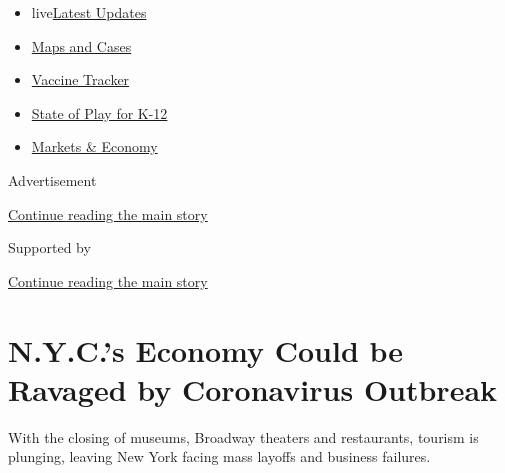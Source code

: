 \begin{itemize}
\tightlist
\item
  live\href{https://www.nytimes3xbfgragh.onion/2020/08/17/world/coronavirus-covid.html?name=styln-coronavirus-national\&region=TOP_BANNER\&variant=undefined\&block=storyline_menu_recirc\&action=click\&pgtype=Article\&impression_id=5fba8b31-e0fd-11ea-90ad-4f7da0581532}{Latest
  Updates}
\item
  \href{https://www.nytimes3xbfgragh.onion/interactive/2020/us/coronavirus-us-cases.html?name=styln-coronavirus-national\&region=TOP_BANNER\&variant=undefined\&block=storyline_menu_recirc\&action=click\&pgtype=Article\&impression_id=5fbab240-e0fd-11ea-90ad-4f7da0581532}{Maps
  and Cases}
\item
  \href{https://www.nytimes3xbfgragh.onion/interactive/2020/science/coronavirus-vaccine-tracker.html?name=styln-coronavirus-national\&region=TOP_BANNER\&variant=undefined\&block=storyline_menu_recirc\&action=click\&pgtype=Article\&impression_id=5fbab241-e0fd-11ea-90ad-4f7da0581532}{Vaccine
  Tracker}
\item
  \href{https://www.nytimes3xbfgragh.onion/2020/08/17/us/k-12-schools-reopening.html?name=styln-coronavirus-national\&region=TOP_BANNER\&variant=undefined\&block=storyline_menu_recirc\&action=click\&pgtype=Article\&impression_id=5fbab242-e0fd-11ea-90ad-4f7da0581532}{State
  of Play for K-12}
\item
  \href{https://www.nytimes3xbfgragh.onion/live/2020/08/17/business/stock-market-today-coronavirus?name=styln-coronavirus-national\&region=TOP_BANNER\&variant=undefined\&block=storyline_menu_recirc\&action=click\&pgtype=Article\&impression_id=5fbab243-e0fd-11ea-90ad-4f7da0581532}{Markets
  \& Economy}
\end{itemize}

Advertisement

\protect\hyperlink{after-top}{Continue reading the main story}

Supported by

\protect\hyperlink{after-sponsor}{Continue reading the main story}

\hypertarget{nycs-economy-could-be-ravaged-by-coronavirus-outbreak}{%
\section{N.Y.C.'s Economy Could be Ravaged by Coronavirus
Outbreak}\label{nycs-economy-could-be-ravaged-by-coronavirus-outbreak}}

With the closing of museums, Broadway theaters and restaurants, tourism
is plunging, leaving New York facing mass layoffs and business failures.

